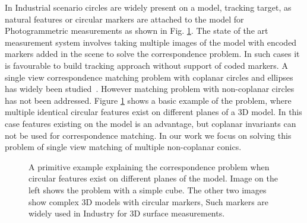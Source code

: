 \documentclass{bmvc2k}
\begin{document}
\par 
In Industrial scenario circles are widely present on a model, tracking target, as natural features or circular markers are attached to the model for Photogrammetric measurements \cite{luhmann_close_2006} as shown in Fig. \ref{fig:introProblem}.
The state of the art measurement system involves taking multiple images of the model with encoded markers added in the scene to solve the correspondence problem. 
In such cases it is favourable to build tracking approach without support of coded markers. 
A single view correspondence matching problem with coplanar circles and ellipses has widely been studied~\cite{lepetit_monocular_2005,forsyth_91,Ferri_1993}.
However matching problem with non-coplanar circles has not been addressed.
Figure \ref{fig:introProblem} shows a basic example of the problem, where multiple identical circular features exist on different planes of a 3D model.
In this case features existing on the model is an advantage, but coplanar invariants can not be used for correspondence matching.
In our work we focus on solving this problem of single view matching of multiple non-coplanar conics.
\begin{figure}[tb]
\centering
\caption{A primitive example explaining the correspondence problem when circular features exist on different planes of the model. Image on the left shows the problem with a simple cube. The other two images show complex 3D models with circular markers, Such markers are widely used in Industry for 3D surface measurements. }

\label{fig:introProblem}
\end{figure}
\end{document}
